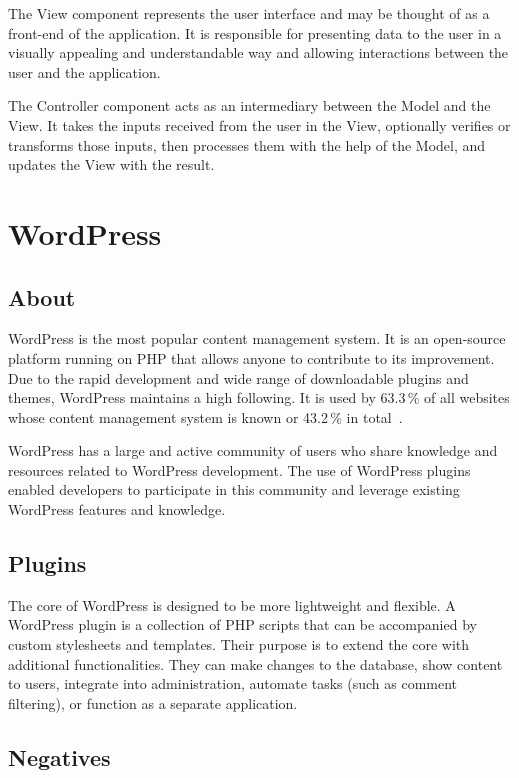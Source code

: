 \documentclass[
  digital,     %
  oneside,     %
  nosansbold,  %
  colorbold, %
  lof,         %
  lot,         %
]{fithesis4}
\begin{document}
The View component represents the user interface and may be thought of as a front-end of the application. It is responsible for presenting data to the user in a visually appealing and understandable way and allowing interactions between the user and the application.

The Controller component acts as an intermediary between the Model and the View. It takes the inputs received from the user in the View, optionally verifies or transforms those inputs, then processes them with the help of the Model, and updates the View with the result.

\section{WordPress}
\label{sect:wordpress}

\subsection{About}

WordPress is the most popular content management system. It is an \mbox{open-source}
platform running on PHP that allows anyone to contribute to its improvement.
Due to the rapid development and wide range of downloadable plugins and themes,
WordPress maintains a high following. It is used by 63.3\,\% of all websites whose
content management system is known or 43.2\,\% in total~\cite{w3_wordpress}.

WordPress has a large and active community of users who share knowledge and
resources related to WordPress development. The use of WordPress plugins
enabled developers to participate in this community and leverage existing
WordPress features and knowledge.

\subsection{Plugins}

The core of WordPress is designed to be more lightweight and flexible. A WordPress
plugin is a collection of PHP scripts that can be accompanied by custom stylesheets
and templates. Their purpose is to extend the core with additional functionalities.
They can make changes to the database, show content to users, integrate into
administration, automate tasks (such as comment filtering), or function as
a separate application.

\subsection{Negatives}
\end{document}
